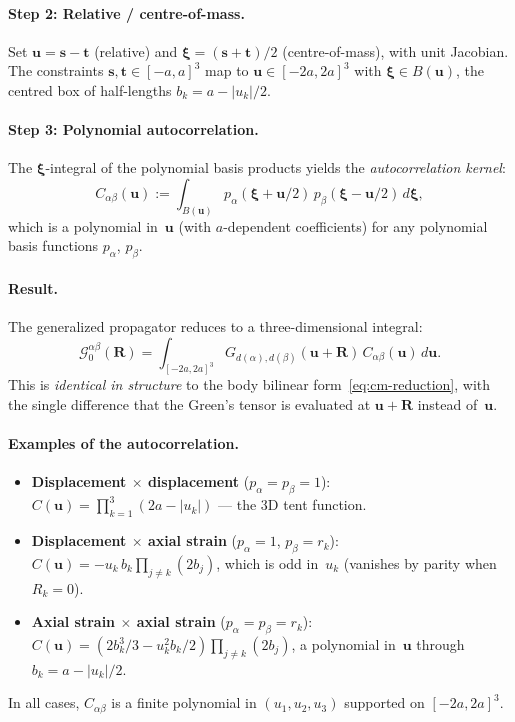 \documentclass[11pt,a4paper]{article}
\newcommand{\bs}{\bm{s}}
\newcommand{\bxi}{\bm{\xi}}
\newcommand{\bu}{\bm{u}}
\newcommand{\bR}{\bm{R}}
\newcommand{\bt}{\bm{t}}
\newcommand{\Gprop}{\mathcal{G}_0}
\theoremstyle{plain}
\theoremstyle{definition}
\theoremstyle{remark}
\begin{document}
\paragraph{Step 2: Relative / centre-of-mass.}
Set $\bu = \bs - \bt$ (relative) and $\bxi = (\bs + \bt)/2$
(centre-of-mass), with unit Jacobian.  The constraints
$\bs, \bt \in [-a,a]^3$ map to $\bu \in [-2a,2a]^3$ with
$\bxi \in B(\bu)$, the centred box of half-lengths
$b_k = a - |u_k|/2$.

\paragraph{Step 3: Polynomial autocorrelation.}
The $\bxi$-integral of the polynomial basis products yields the
\emph{autocorrelation kernel}:
\begin{equation}
  C_{\alpha\beta}(\bu)
  := \int_{B(\bu)}\!p_\alpha(\bxi + \bu/2)\,
     p_\beta(\bxi - \bu/2)\,d\bxi,
  \label{eq:autocorr-def}
\end{equation}
which is a polynomial in~$\bu$ (with $a$-dependent coefficients) for
any polynomial basis functions $p_\alpha$, $p_\beta$.

\paragraph{Result.}
The generalized propagator reduces to a three-dimensional integral:
\begin{equation}
  \boxed{\;
  \Gprop^{\alpha\beta}(\bR)
  = \int_{[-2a,2a]^3}\!
    G_{d(\alpha),d(\beta)}(\bu + \bR)\,
    C_{\alpha\beta}(\bu)\,d\bu.  \;}
  \label{eq:Gprop-reduced}
\end{equation}
This is \emph{identical in structure} to the body bilinear
form~\eqref{eq:cm-reduction}, with the single difference that
the Green's tensor is evaluated at $\bu + \bR$ instead of~$\bu$.

\paragraph{Examples of the autocorrelation.}
\begin{itemize}[nosep]
  \item \textbf{Displacement $\times$ displacement}
    ($p_\alpha = p_\beta = 1$):
    $C(\bu) = \prod_{k=1}^3 (2a - |u_k|)$ --- the 3D tent function.
  \item \textbf{Displacement $\times$ axial strain}
    ($p_\alpha = 1$, $p_\beta = r_k$):
    $C(\bu) = -u_k\,b_k \prod_{j \neq k}(2b_j)$,
    which is odd in~$u_k$ (vanishes by parity when $R_k = 0$).
  \item \textbf{Axial strain $\times$ axial strain}
    ($p_\alpha = p_\beta = r_k$):
    $C(\bu) = (2b_k^3/3 - u_k^2 b_k/2)\prod_{j \neq k}(2b_j)$,
    a polynomial in~$\bu$ through $b_k = a - |u_k|/2$.
\end{itemize}
In all cases, $C_{\alpha\beta}$ is a finite polynomial in
$(u_1, u_2, u_3)$ supported on $[-2a,2a]^3$.
\end{document}
